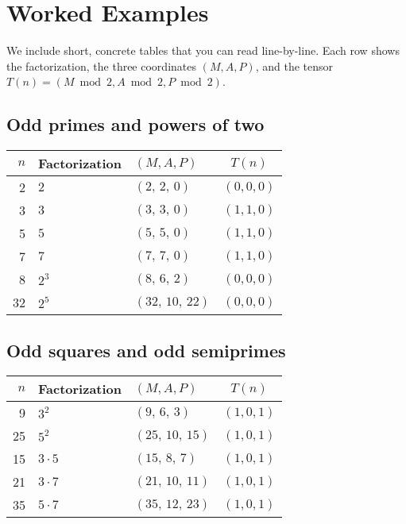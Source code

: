 \documentclass[11pt,a4paper]{article}
\numberwithin{equation}{section}
\numberwithin{figure}{section}
\numberwithin{table}{section}
\theoremstyle{plain}
\theoremstyle{definition}
\theoremstyle{remark}
\begin{document}
\section{Worked Examples}
We include short, concrete tables that you can read line-by-line. Each row shows the factorization, the three coordinates \((M,A,P)\), and the tensor \(T(n)=(M\bmod 2, A\bmod 2, P\bmod 2)\).

\subsection*{Odd primes and powers of two}
\begin{center}
\begin{tabular}{r l l c}
\toprule
\(n\) & Factorization & \((M,A,P)\) & \(T(n)\) \\
\midrule
2  & \(2\)       & \((2,\,2,\,0)\)     & \((0,0,0)\) \\
3  & \(3\)       & \((3,\,3,\,0)\)     & \((1,1,0)\) \\
5  & \(5\)       & \((5,\,5,\,0)\)     & \((1,1,0)\) \\
7  & \(7\)       & \((7,\,7,\,0)\)     & \((1,1,0)\) \\
8  & \(2^3\)     & \((8,\,6,\,2)\)     & \((0,0,0)\) \\
32 & \(2^5\)     & \((32,\,10,\,22)\)  & \((0,0,0)\) \\
\bottomrule
\end{tabular}
\end{center}

\subsection*{Odd squares and odd semiprimes}
\begin{center}
\begin{tabular}{r l l c}
\toprule
\(n\) & Factorization & \((M,A,P)\) & \(T(n)\) \\
\midrule
9   & \(3^2\)     & \((9,\,6,\,3)\)    & \((1,0,1)\) \\
25  & \(5^2\)     & \((25,\,10,\,15)\) & \((1,0,1)\) \\
15  & \(3\cdot 5\)  & \((15,\,8,\,7)\)   & \((1,0,1)\) \\
21  & \(3\cdot 7\)  & \((21,\,10,\,11)\) & \((1,0,1)\) \\
35  & \(5\cdot 7\)  & \((35,\,12,\,23)\) & \((1,0,1)\) \\
\bottomrule
\end{tabular}
\end{center}
\end{document}
